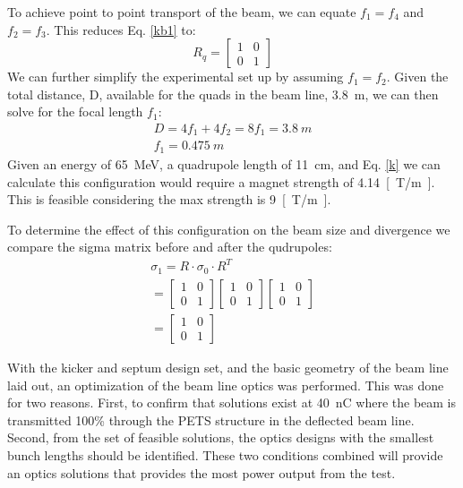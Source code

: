 To achieve point to point transport of the beam, we can 
equate $f_1 = f_4$ and $f_2 = f_3$. This reduces Eq. \ref{kb1} to:
 \begin{equation}
R_q =
\begin{bmatrix}
1 & 0 \\
0 & 1	
\end{bmatrix}
\end{equation}
We can further simplify the experimental set up by 
assuming $f_1=f_2$. Given the total distance, D, available for the
quads in the beam line, \SI{3.8}{m}, we can then solve
for the focal length $f_1$: 
\begin{align}
	D = 4f_1 + 4 f_2 = 8f_1 = \SI{3.8}{m} \\
	f_1 = \SI{0.475}{m}
\end{align}
Given an energy of \SI{65}{MeV}, a quadrupole length of \SI{11}{cm}, 
and Eq. \ref{k} we can calculate this configuration would require a 
magnet strength of \SI{4.14}{[T/m]}. This is feasible considering the 
max strength is \SI{9}{[T/m]}.

To determine the effect of this configuration on the beam size and divergence
we compare the sigma matrix before and after the qudrupoles:
\begin{align}
	\sigma_1 = R\cdot \sigma_0 \cdot R^T \\
	= 
	\begin{bmatrix}
	1 & 0 \\
	0 & 1	
	\end{bmatrix}
	\begin{bmatrix}
	1 & 0 \\
	0 & 1	
	\end{bmatrix}
    \begin{bmatrix}
	1 & 0 \\
	0 & 1	
	\end{bmatrix} \\
	=
	\begin{bmatrix}
	1 & 0 \\
	0 & 1	
	\end{bmatrix}
\end{align}


 
With the kicker and septum design set, 
and the basic geometry of the beam line laid out, 
an optimization of the beam line optics was performed.
This was done for two reasons. First, to confirm that solutions 
exist at \SI{40}{nC} where the beam is transmitted 100\% through the PETS structure in the deflected beam line.
Second, from the set of feasible solutions, the optics designs with the smallest bunch lengths should be identified.
These two conditions combined will provide an optics solutions that provides the most power output from the test. 

